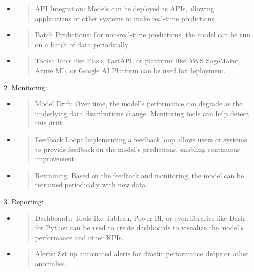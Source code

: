 \documentclass[
]{article}
\begin{document}
\begin{itemize}
\item
  \begin{quote}
  API Integration: Models can be deployed as APIs, allowing applications
  or other systems to make real-time predictions.
  \end{quote}
\item
  \begin{quote}
  Batch Predictions: For non-real-time predictions, the model can be run
  on a batch of data periodically.
  \end{quote}
\item
  \begin{quote}
  Tools: Tools like Flask, FastAPI, or platforms like AWS SageMaker,
  Azure ML, or Google AI Platform can be used for deployment.
  \end{quote}
\end{itemize}

2. Monitoring:

\begin{itemize}
\item
  \begin{quote}
  Model Drift: Over time, the model's performance can degrade as the
  underlying data distributions change. Monitoring tools can help detect
  this drift.
  \end{quote}
\item
  \begin{quote}
  Feedback Loop: Implementing a feedback loop allows users or systems to
  provide feedback on the model's predictions, enabling continuous
  improvement.
  \end{quote}
\item
  \begin{quote}
  Retraining: Based on the feedback and monitoring, the model can be
  retrained periodically with new data.
  \end{quote}
\end{itemize}

3. Reporting:

\begin{itemize}
\item
  \begin{quote}
  Dashboards: Tools like Tableau, Power BI, or even libraries like Dash
  for Python can be used to create dashboards to visualize the model's
  performance and other KPIs.
  \end{quote}
\item
  \begin{quote}
  Alerts: Set up automated alerts for drastic performance drops or other
  anomalies.
  \end{quote}
\end{itemize}
\end{document}
